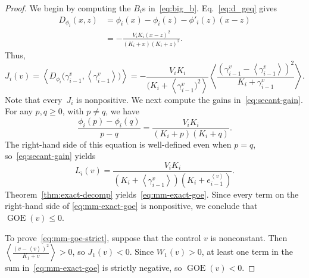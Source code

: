 \documentclass[onecolumn]{IEEEtran}
\newcommand{\GOE}{\operatorname{GOE}}
\newcommand{\avg}[1]{\left\langle #1\right\rangle}
\begin{document}
\begin{proof}
  We begin by computing   the $B_i$s in~\eqref{eq:big_b}. Eq.~\eqref{eq:d_geq} gives
\begin{align*}
D_{\phi_i} (x,z) &= \phi_i(x)-\phi_i(z) -\phi'_i(z)(x-z)\\
& =   -
    \frac{V_iK_i(x-z)^2}
    {(K_i+x)(K_i+z)^2}  . 
\end{align*}
Thus,
\[
 J_i(v)
      =
    \avg{
    D_{\phi_i}
    \bigl(
    \gamma_{i-1}^v,
    \avg{\gamma_{i-1}^v}
    \bigr)
    }=  
    - \frac{ V_iK_i } { (K_i+\avg  {\gamma_{i-1}^v)^2} } 
 \avg{   \frac{ ( \gamma_{i-1}^v-\avg { \gamma_{i-1}^v})^2}
    { K_i+ \gamma_{i-1}^v  }  
}  .
\]
 Note that every~$J_i$ is nonpositive. 
We next compute the   gains in~\eqref{eq:secant-gain}. For any $p,q\geq0$, with $p\neq q$, we have 
\begin{equation*}
    \frac{\phi_i(p)-\phi_i(q)}{p-q}
    =
    \frac{V_iK_i}
    {(K_i+p)(K_i+q)}. 
\end{equation*}
The right-hand side of this equation is well-defined even when $p=q$, 
 so~\eqref{eq:secant-gain} yields 
 \begin{equation*}
    L_i(v)
     = \frac{V_iK_i}
    {(K_i+\avg{\gamma_{i-1}^v})(K_i+e_{i-1}^{\avg {v}})}.
      \end{equation*}
 Theorem~\ref{thm:exact-decomp} yields~\eqref{eq:mm-exact-goe}.
 Since every term on the right-hand side of
\eqref{eq:mm-exact-goe} is nonpositive, we conclude that
   $ \GOE(v)\leq0$.

To prove~\eqref{eq:mm-goe-strict}, suppose that the control $v$ is nonconstant. Then
 $   \avg{
    \frac{(v-\avg v)^2}{K_1+v}
    }
    >0$, 
so $J_1(v)<0$. Since $W_1(v)>0$, at least one term in the sum in~\eqref{eq:mm-exact-goe} is strictly negative,  so
    $\GOE(v)<0$.
\end{proof}

\end{document}
